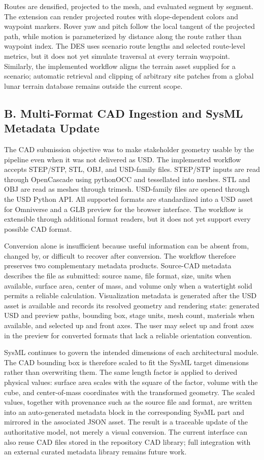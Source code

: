 Routes are densified, projected to the mesh, and evaluated segment by segment. The extension can render projected routes with slope-dependent colors and waypoint markers. Rover yaw and pitch follow the local tangent of the projected path, while motion is parameterized by distance along the route rather than waypoint index. The DES uses scenario route lengths and selected route-level metrics, but it does not yet simulate traversal at every terrain waypoint. Similarly, the implemented workflow aligns the terrain asset supplied for a scenario; automatic retrieval and clipping of arbitrary site patches from a global lunar terrain database remains outside the current scope.

\subsection{B. Multi-Format CAD Ingestion and SysML Metadata Update}

The CAD submission objective was to make stakeholder geometry usable by the pipeline even when it was not delivered as USD. The implemented workflow accepts STEP/STP, STL, OBJ, and USD-family files. STEP/STP inputs are read through OpenCascade using pythonOCC and tessellated into meshes. STL and OBJ are read as meshes through trimesh. USD-family files are opened through the USD Python API. All supported formats are standardized into a USD asset for Omniverse and a GLB preview for the browser interface. The workflow is extensible through additional format readers, but it does not yet support every possible CAD format.

Conversion alone is insufficient because useful information can be absent from, changed by, or difficult to recover after conversion. The workflow therefore preserves two complementary metadata products. Source-CAD metadata describes the file as submitted: source name, file format, size, units when available, surface area, center of mass, and volume only when a watertight solid permits a reliable calculation. Visualization metadata is generated after the USD asset is available and records its resolved geometry and rendering state: generated USD and preview paths, bounding box, stage units, mesh count, materials when available, and selected up and front axes. The user may select up and front axes in the preview for converted formats that lack a reliable orientation convention.

SysML continues to govern the intended dimensions of each architectural module. The CAD bounding box is therefore scaled to fit the SysML target dimensions rather than overwriting them. The same length factor is applied to derived physical values: surface area scales with the square of the factor, volume with the cube, and center-of-mass coordinates with the transformed geometry. The scaled values, together with provenance such as the source file and format, are written into an auto-generated metadata block in the corresponding SysML part and mirrored in the associated JSON asset. The result is a traceable update of the authoritative model, not merely a visual conversion. The current interface can also reuse CAD files stored in the repository CAD library; full integration with an external curated metadata library remains future work.

